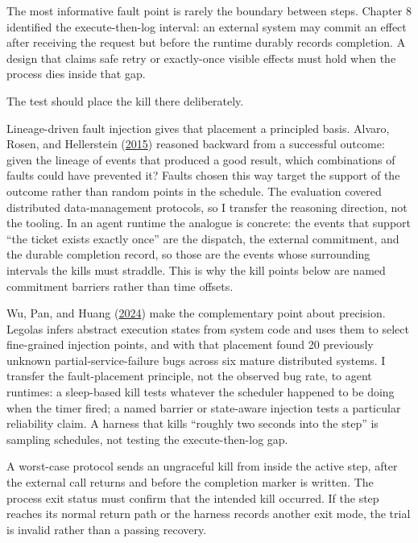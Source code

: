 The most informative fault point is rarely the boundary between steps. Chapter 8 identified the execute-then-log interval: an external system may commit an effect after receiving the request but before the runtime durably records completion. A design that claims safe retry or exactly-once visible effects must hold when the process dies inside that gap.

The test should place the kill there deliberately.

Lineage-driven fault injection gives that placement a principled basis. Alvaro, Rosen, and Hellerstein (\href{https://dl.acm.org/doi/10.1145/2723372.2723711}{2015}) reasoned backward from a successful outcome: given the lineage of events that produced a good result, which combinations of faults could have prevented it? Faults chosen this way target the support of the outcome rather than random points in the schedule. The evaluation covered distributed data-management protocols, so I transfer the reasoning direction, not the tooling. In an agent runtime the analogue is concrete: the events that support ``the ticket exists exactly once'' are the dispatch, the external commitment, and the durable completion record, so those are the events whose surrounding intervals the kills must straddle. This is why the kill points below are named commitment barriers rather than time offsets.

Wu, Pan, and Huang (\href{https://www.usenix.org/conference/nsdi24/presentation/wu-haoze}{2024}) make the complementary point about precision. Legolas infers abstract execution states from system code and uses them to select fine-grained injection points, and with that placement found 20 previously unknown partial-service-failure bugs across six mature distributed systems. I transfer the fault-placement principle, not the observed bug rate, to agent runtimes: a sleep-based kill tests whatever the scheduler happened to be doing when the timer fired; a named barrier or state-aware injection tests a particular reliability claim. A harness that kills ``roughly two seconds into the step'' is sampling schedules, not testing the execute-then-log gap.

A worst-case protocol sends an ungraceful kill from inside the active step, after the external call returns and before the completion marker is written. The process exit status must confirm that the intended kill occurred. If the step reaches its normal return path or the harness records another exit mode, the trial is invalid rather than a passing recovery.

